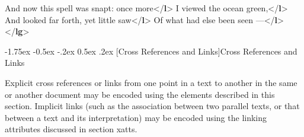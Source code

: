 \documentclass[11pt,twoside]{article}\makeatletter
\makeatletter
\renewcommand\section{\@startsection {section}{1}{\z@}%
     {-1.75ex \@plus -0.5ex \@minus -.2ex}%
     {0.5ex \@plus .2ex}%
     {\reset@font\Large\bfseries\sffamily}}
\makeatother
\begin{document}
\begin{shaded}
And now this spell was snapt: once more{</\textbf{l}>}\mbox{}\newline 
{}I viewed the ocean green,{</\textbf{l}>}\mbox{}\newline 
{}And looked far forth, yet little saw{</\textbf{l}>}\mbox{}\newline 
{}Of what had else been seen —{</\textbf{l}>}\mbox{}\newline 
{</\textbf{lg}>}\end{shaded}\egroup\par 
\section[{Cross References and Links}]{Cross References and Links}\label{U5-ptrs}\par
Explicit cross references or links from one point in a text to another in the same or another document may be encoded using the elements described in this section. Implicit links (such as the association between two parallel texts, or that between a text and its interpretation) may be encoded using the linking attributes discussed in section xatts.
\end{document}

